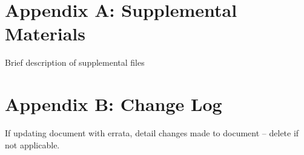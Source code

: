 \documentclass[12pt]{article}
\begin{document}

\section*{Appendix A: Supplemental Materials}
Brief description of supplemental files\\

\section*{Appendix B: Change Log}
If updating document with errata, detail changes made to document – delete if not applicable. \\
\end{document}
